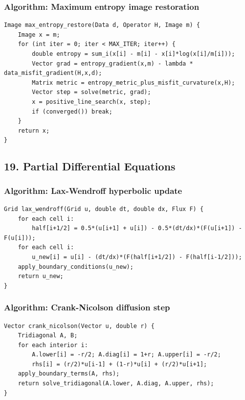 \documentclass[11pt]{article}
\begin{document}
\subsubsection{Algorithm: Maximum entropy image restoration}\label{algorithm-maximum-entropy-image-restoration}

\begin{verbatim}
Image max_entropy_restore(Data d, Operator H, Image m) {
    Image x = m;
    for (int iter = 0; iter < MAX_ITER; iter++) {
        double entropy = sum_i(x[i] - m[i] - x[i]*log(x[i]/m[i]));
        Vector grad = entropy_gradient(x,m) - lambda * data_misfit_gradient(H,x,d);
        Matrix metric = entropy_metric_plus_misfit_curvature(x,H);
        Vector step = solve(metric, grad);
        x = positive_line_search(x, step);
        if (converged()) break;
    }
    return x;
}
\end{verbatim}

\subsection{19. Partial Differential Equations}\label{partial-differential-equations}

\subsubsection{Algorithm: Lax-Wendroff hyperbolic update}\label{algorithm-lax-wendroff-hyperbolic-update}

\begin{verbatim}
Grid lax_wendroff(Grid u, double dt, double dx, Flux F) {
    for each cell i:
        half[i+1/2] = 0.5*(u[i+1] + u[i]) - 0.5*(dt/dx)*(F(u[i+1]) - F(u[i]));
    for each cell i:
        u_new[i] = u[i] - (dt/dx)*(F(half[i+1/2]) - F(half[i-1/2]));
    apply_boundary_conditions(u_new);
    return u_new;
}
\end{verbatim}

\subsubsection{Algorithm: Crank-Nicolson diffusion step}\label{algorithm-crank-nicolson-diffusion-step}

\begin{verbatim}
Vector crank_nicolson(Vector u, double r) {
    Tridiagonal A, B;
    for each interior i:
        A.lower[i] = -r/2; A.diag[i] = 1+r; A.upper[i] = -r/2;
        rhs[i] = (r/2)*u[i-1] + (1-r)*u[i] + (r/2)*u[i+1];
    apply_boundary_terms(A, rhs);
    return solve_tridiagonal(A.lower, A.diag, A.upper, rhs);
}
\end{verbatim}
\end{document}

